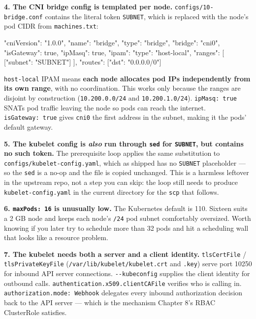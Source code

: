 \documentclass[11pt,oneside]{report}
\begin{document}
\textbf{4. The CNI
bridge config is
templated per node.}
\texttt{configs/}\allowbreak{}\texttt{10-}\allowbreak{}\texttt{bridge.}\allowbreak{}\texttt{conf}
contains the literal
token
\texttt{SUBNET},
which is replaced
with the node's pod
CIDR from
\texttt{machines.txt}:

\begin{outlst}
{
  "cniVersion": "1.0.0",
  "name": "bridge",
  "type": "bridge",
  "bridge": "cni0",
  "isGateway": true,
  "ipMasq": true,
  "ipam": {
    "type": "host-local",
    "ranges": [
      [{"subnet": "SUBNET"}]
    ],
    "routes": [{"dst": "0.0.0.0/0"}]
  }
}
\end{outlst}

\texttt{host-local}
IPAM means
\textbf{each node
allocates pod IPs
independently from
its own range}, with
no coordination.
This works only
because the ranges
are disjoint by
construction
(\texttt{10.200.0.0/24}
and
\texttt{10.200.1.0/24}).
\texttt{ipMasq:\ true}
SNATs pod traffic
leaving the node so
pods can reach the
internet.
\texttt{isGateway:\ true}
gives \texttt{cni0}
the first address in
the subnet, making
it the pods' default
gateway.

\textbf{5. The
kubelet config is
\emph{also} run
through \texttt{sed}
for \texttt{SUBNET},
but contains no such
token.} The
prerequisite loop
applies the same
substitution to
\texttt{configs/}\allowbreak{}\texttt{kubelet-}\allowbreak{}\texttt{config.}\allowbreak{}\texttt{yaml},
which as shipped has
no \texttt{SUBNET}
placeholder --- so
the \texttt{sed} is
a no-op and the file
is copied unchanged.
This is a harmless
leftover in the
upstream repo, not a
step you can skip:
the loop still needs
to produce
\texttt{kubelet-}\allowbreak{}\texttt{config.}\allowbreak{}\texttt{yaml}
in the current
directory for the
\texttt{scp} that
follows.

\textbf{6.
\texttt{maxPods:\ 16}
is unusually low.}
The Kubernetes
default is 110.
Sixteen suits a 2 GB
node and keeps each
node's \texttt{/24}
pod subnet
comfortably
oversized. Worth
knowing if you later
try to schedule more
than 32 pods and hit
a scheduling wall
that looks like a
resource problem.

\textbf{7. The
kubelet needs both a
server and a client
identity.}
\texttt{tlsCertFile}
/
\texttt{tlsPrivateKeyFile}
(\texttt{/}\allowbreak{}\texttt{var/}\allowbreak{}\texttt{lib/}\allowbreak{}\texttt{kubelet/}\allowbreak{}\texttt{kubelet.}\allowbreak{}\texttt{crt}
and \texttt{.key})
serve port 10250 for
inbound API server
connections.
\texttt{-\/-kubeconfig}
supplies the client
identity for
outbound calls.
\texttt{authentication.}\allowbreak{}\texttt{x509.}\allowbreak{}\texttt{clientCAFile}
verifies who is
calling in.
\texttt{authorization.}\allowbreak{}\texttt{mode:}\allowbreak{}\texttt{\ Webhook}
delegates every
inbound
authorization
decision back to the
API server --- which
is the mechanism
Chapter 8's RBAC
ClusterRole
satisfies.
\end{document}
